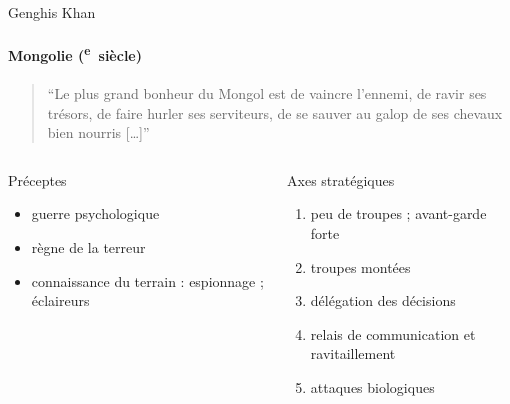 \documentclass[utf8,hyperref={pagebackref}]{beamer}
\newcommand{\cRM}[1]{\MakeUppercase{\romannumeral #1}}  %
\newcommand{\siecle}[1]{\cRM{#1}\textsuperscript{e}~siècle}
\begin{document}
\begin{frame}{Genghis Khan}
\framesubtitle{Mongolie (\siecle{12})}
\begin{quote}“Le plus grand bonheur du Mongol est de vaincre l’ennemi, de ravir ses trésors, de faire hurler ses serviteurs, de se sauver au galop de ses chevaux bien nourris [\ldots]”\end{quote}
\vfill
\begin{columns}[t]
\begin{column}{0.5\linewidth}
Préceptes
\begin{itemize}
\item guerre psychologique
\item règne de la terreur
\item connaissance du terrain : espionnage ; éclaireurs
\end{itemize}
\end{column}
\begin{column}{0.5\linewidth}
Axes stratégiques
\begin{enumerate}
\item peu de troupes ; avant-garde forte
\item troupes montées %
\item délégation des décisions
\item relais de communication et ravitaillement
\item attaques biologiques
\end{enumerate}
\end{column}
\end{columns}
\end{frame}
\end{document}
